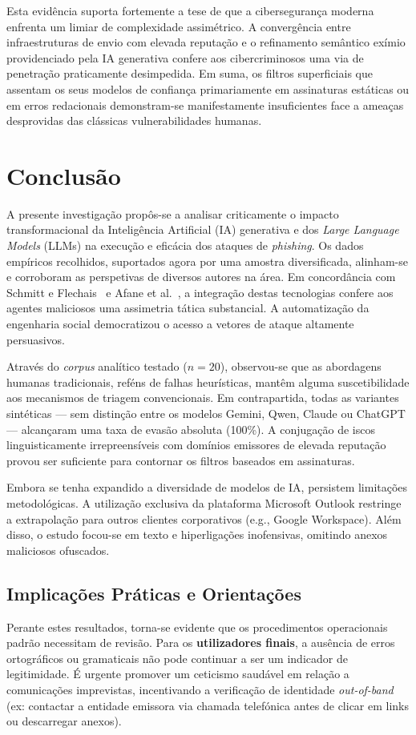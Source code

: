 \documentclass[pdflatex,sn-mathphys-num]{sn-jnl}
\theoremstyle{thmstyleone}%
\theoremstyle{thmstyletwo}%
\theoremstyle{thmstylethree}%
\begin{document}
Esta evidência suporta fortemente a tese de que a cibersegurança moderna enfrenta um limiar de complexidade assimétrico. A convergência entre infraestruturas de envio com elevada reputação e o refinamento semântico exímio providenciado pela IA generativa confere aos cibercriminosos uma via de penetração praticamente desimpedida. Em suma, os filtros superficiais que assentam os seus modelos de confiança primariamente em assinaturas estáticas ou em erros redacionais demonstram-se manifestamente insuficientes face a ameaças desprovidas das clássicas vulnerabilidades humanas.





\section{Conclusão}\label{sec5}
A presente investigação propôs-se a analisar criticamente o impacto transformacional da Inteligência Artificial (IA) generativa e dos \textit{Large Language Models} (LLMs) na execução e eficácia dos ataques de \textit{phishing}. Os dados empíricos recolhidos, suportados agora por uma amostra diversificada, alinham-se e corroboram as perspetivas de diversos autores na área. Em concordância com Schmitt e Flechais~\cite{bib3} e Afane et al.~\cite{bib11}, a integração destas tecnologias confere aos agentes maliciosos uma assimetria tática substancial. A automatização da engenharia social democratizou o acesso a vetores de ataque altamente persuasivos.

Através do \textit{corpus} analítico testado ($n=20$), observou-se que as abordagens humanas tradicionais, reféns de falhas heurísticas, mantêm alguma suscetibilidade aos mecanismos de triagem convencionais. Em contrapartida, todas as variantes sintéticas --- sem distinção entre os modelos Gemini, Qwen, Claude ou ChatGPT --- alcançaram uma taxa de evasão absoluta (100\%). A conjugação de iscos linguisticamente irrepreensíveis com domínios emissores de elevada reputação provou ser suficiente para contornar os filtros baseados em assinaturas.

Embora se tenha expandido a diversidade de modelos de IA, persistem limitações metodológicas. A utilização exclusiva da plataforma Microsoft Outlook restringe a extrapolação para outros clientes corporativos (e.g., Google Workspace). Além disso, o estudo focou-se em texto e hiperligações inofensivas, omitindo anexos maliciosos ofuscados.

\subsection*{Implicações Práticas e Orientações}
Perante estes resultados, torna-se evidente que os procedimentos operacionais padrão necessitam de revisão. 
Para os \textbf{utilizadores finais}, a ausência de erros ortográficos ou gramaticais não pode continuar a ser um indicador de legitimidade. É urgente promover um ceticismo saudável em relação a comunicações imprevistas, incentivando a verificação de identidade \textit{out-of-band} (ex: contactar a entidade emissora via chamada telefónica antes de clicar em links ou descarregar anexos).
\end{document}
